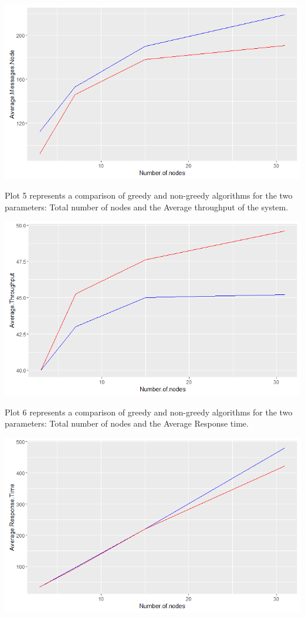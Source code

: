 \documentclass{article}
\begin{document}
\begin{center}
    \includegraphics[width=\textwidth]{figs/Plot4} \\
\end{center}

Plot 5 represents a comparison of greedy and non-greedy algorithms for the two parameters: Total number of nodes and the Average throughput of the system. \\

\begin{center}
    \includegraphics[width=\textwidth]{figs/Plot5} \\
\end{center}

Plot 6 represents a comparison of greedy and non-greedy algorithms for the two parameters: Total number of nodes and the Average Response time. \\

\begin{center}
    \includegraphics[width=\textwidth]{figs/Plot6} \\
\end{center}
\end{document}
